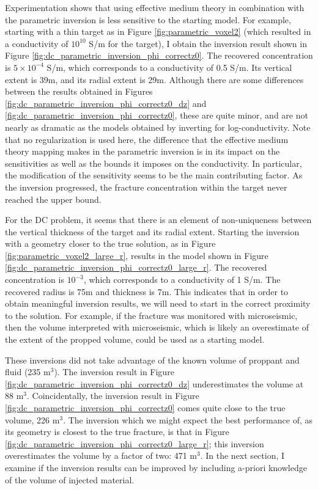 Experimentation shows that using effective medium theory in combination with the parametric inversion is less sensitive to the starting model. For example, starting with a thin target as in Figure \ref{fig:parametric_voxel2} (which resulted in a conductivity of $10^{10}$ S/m for the target), I obtain the inversion result shown in Figure \ref{fig:dc_parametric_inversion_phi_correctz0}. The recovered concentration is $5 \times 10^{-4}$ S/m, which corresponds to a conductivity of 0.5 S/m. Its vertical extent is 39m, and its radial extent is 29m. Although there are some differences between the results obtained in Figures \ref{fig:dc_parametric_inversion_phi_correctz0_dz} and \ref{fig:dc_parametric_inversion_phi_correctz0}, these are quite minor, and are not nearly as dramatic as the models obtained by inverting for log-conductivity. Note that no regularization is used here, the difference that the effective medium theory mapping makes in the parametric inversion is in its impact on the sensitivities as well as the bounds it imposes on the conductivity. In particular, the modification of the sensitivity seems to be the main contributing factor. As the inversion progressed, the fracture concentration within the target never reached the upper bound.





For the DC problem, it seems that there is an element of non-uniqueness between the vertical thickness of the target and its radial extent. Starting the inversion with a geometry closer to the true solution, as in Figure \ref{fig:parametric_voxel2_large_r}, results in the model shown in Figure \ref{fig:dc_parametric_inversion_phi_correctz0_large_r}. The recovered concentration is $10^{-3}$, which corresponds to a conductivity of 1 S/m. The recovered radius is 75m and thickness is 7m. This indicates that in order to obtain meaningful inversion results, we will need to start in the correct proximity to the solution. For example, if the fracture was monitored with microseismic, then the volume interpreted with microseismic, which is likely an overestimate of the extent of the propped volume, could be used as a starting model.








These inversions did not take advantage of the known volume of proppant and fluid (235 m$^3$). The inversion result in Figure \ref{fig:dc_parametric_inversion_phi_correctz0_dz} underestimates the volume at 88 m$^3$. Coincidentally, the inversion result in Figure \ref{fig:dc_parametric_inversion_phi_correctz0} comes quite close to the true volume,
226 m$^3$. The inversion which we might expect the best performance of, as its geometry is closest to the true fracture, is that in Figure \ref{fig:dc_parametric_inversion_phi_correctz0_large_r}; this inversion overestimates the volume by a factor of two: 471 m$^3$. In the next section, I examine if the inversion results can be improved by including a-priori knowledge of the volume of injected material.

